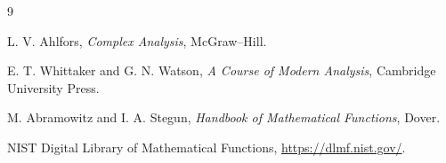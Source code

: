 \documentclass[11pt]{article}
\begin{document}
\begin{thebibliography}{9}

L. V. Ahlfors,
\emph{Complex Analysis},
McGraw--Hill.

E. T. Whittaker and G. N. Watson,
\emph{A Course of Modern Analysis},
Cambridge University Press.

M. Abramowitz and I. A. Stegun,
\emph{Handbook of Mathematical Functions},
Dover.

NIST Digital Library of Mathematical Functions,
\url{https://dlmf.nist.gov/}.

\end{thebibliography}
\end{document}
